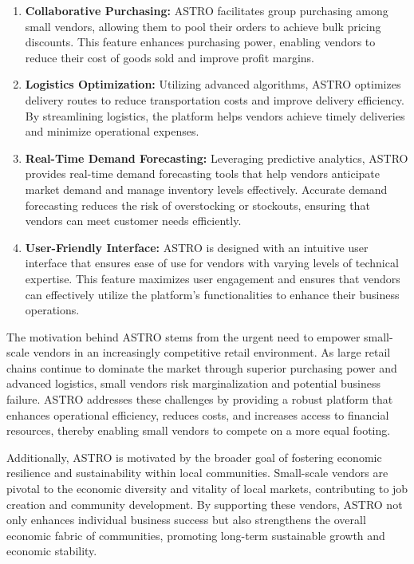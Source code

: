 \begin{enumerate}
	\item \textbf{Collaborative Purchasing:} ASTRO facilitates group purchasing among small vendors, allowing them to pool their orders to achieve bulk pricing discounts. This feature enhances purchasing power, enabling vendors to reduce their cost of goods sold and improve profit margins.

	\item \textbf{Logistics Optimization:} Utilizing advanced algorithms, ASTRO optimizes delivery routes to reduce transportation costs and improve delivery efficiency. By streamlining logistics, the platform helps vendors achieve timely deliveries and minimize operational expenses.

	\item \textbf{Real-Time Demand Forecasting:} Leveraging predictive analytics, ASTRO provides real-time demand forecasting tools that help vendors anticipate market demand and manage inventory levels effectively. Accurate demand forecasting reduces the risk of overstocking or stockouts, ensuring that vendors can meet customer needs efficiently.

	\item \textbf{User-Friendly Interface:} ASTRO is designed with an intuitive user interface that ensures ease of use for vendors with varying levels of technical expertise. This feature maximizes user engagement and ensures that vendors can effectively utilize the platform’s functionalities to enhance their business operations.
\end{enumerate}

The motivation behind ASTRO stems from the urgent need to empower small-scale vendors in an increasingly competitive retail environment. As large retail chains continue to dominate the market through superior purchasing power and advanced logistics, small vendors risk marginalization and potential business failure. ASTRO addresses these challenges by providing a robust platform that enhances operational efficiency, reduces costs, and increases access to financial resources, thereby enabling small vendors to compete on a more equal footing.

Additionally, ASTRO is motivated by the broader goal of fostering economic resilience and sustainability within local communities. Small-scale vendors are pivotal to the economic diversity and vitality of local markets, contributing to job creation and community development. By supporting these vendors, ASTRO not only enhances individual business success but also strengthens the overall economic fabric of communities, promoting long-term sustainable growth and economic stability.
